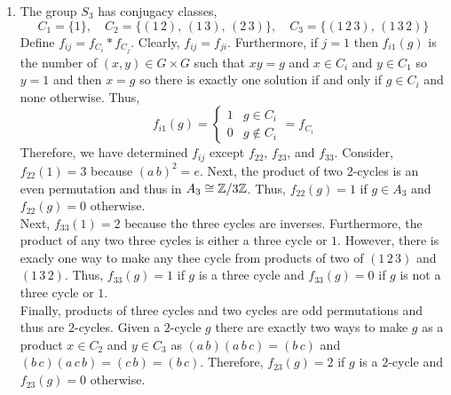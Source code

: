\documentclass[12pt]{extarticle}
\begin{document}
\begin{enumerate}
\item The group $S_3$ has conjugacy classes,
\[ C_1 = \{1\}, \quad  C_2 = \{(1 \, 2), \, (1 \, 3), \, (2 \, 3) \}, \quad C_3 = \{ (1 \, 2 \, 3), \, (1 \, 3 \, 2) \} \]
Define $f_{ij} = f_{C_i} * f_{C_j}$. Clearly, $f_{ij} = f_{ji}$. Furthermore, if $j = 1$ then $f_{i1}(g)$ is the number of $(x, y) \in G \times G$ such that $xy = g$ and $x \in C_i$ and $y \in C_1$ so $y = 1$ and then $x = g$ so there is exactly one solution if and only if $g \in C_i$ and none otherwise. Thus, 
\[ f_{i1}(g) = \begin{cases}
1 & g \in C_i \\
0 & g \notin C_i
\end{cases} = f_{C_i}\] 
Therefore, we have determined $f_{ij}$ except $f_{22}$, $f_{23}$, and $f_{33}$. Consider, $f_{22}(1) = 3$ because $(a \, b)^2 = e$. Next, the product of two $2$-cycles is an even permutation and thus in $A_3 \cong \mathbb{Z}/3\mathbb{Z}$. Thus, $f_{22}(g) = 1$ if $g \in A_3$ and $f_{22}(g) = 0$ otherwise. \bigskip\\
Next, $f_{33}(1) = 2$ because the three cycles are inverses. Furthermore, the product of any two three cycles is either a three cycle or $1$. However, there is exacly one way to make any thee cycle from products of two of $(1 \, 2 \, 3)$ and $(1 \, 3 \, 2)$. Thus, $f_{33}(g) = 1$ if $g$ is a three cycle and $f_{33}(g) = 0$ if $g$ is not a three cycle or $1$. 
\bigskip\\
Finally, products of three cycles and two cycles are odd permutations and thus are  $2$-cycles. Given a $2$-cycle $g$ there are exactly two ways to make $g$ as a product $x \in C_2$ and $y \in C_3$ as $(a \, b)(a \, b \, c) = (b \, c)$ and $(b \, c)(a \, c \, b) = (c \, b) = (b \, c)$. Therefore, $f_{23}(g) = 2$ if $g$ is a $2$-cycle and $f_{23}(g) = 0$ otherwise.     
\end{enumerate}
\end{document}
